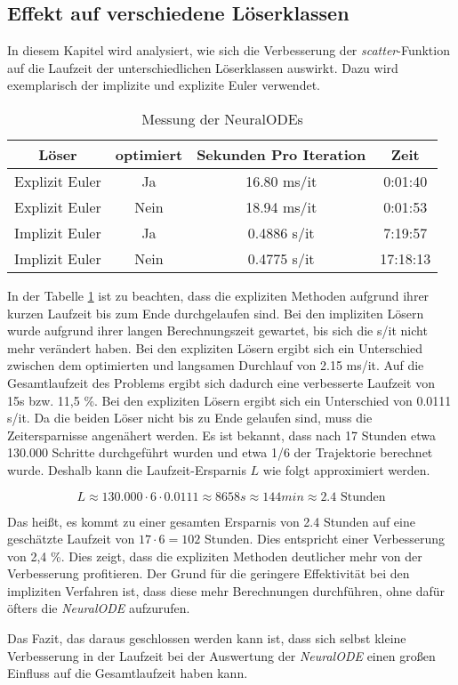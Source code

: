 \subsection{Effekt auf verschiedene Löserklassen}

In diesem Kapitel wird analysiert, wie sich die Verbesserung der \textit{scatter}-Funktion auf die Laufzeit der unterschiedlichen 
Löserklassen auswirkt.
Dazu wird exemplarisch der implizite und explizite Euler verwendet.

\begin{table}[h!]
\centering
    \begin{tabular}{c|c|c|c}
         Löser & optimiert & Sekunden Pro Iteration & Zeit \\
         \hline
         Explizit Euler & Ja & 16.80 ms/it & 0:01:40 \\
         Explizit Euler & Nein & 18.94 ms/it & 0:01:53 \\
         Implizit Euler & Ja & 0.4886 s/it & 7:19:57 \\
         Implizit Euler & Nein &  0.4775 s/it & 17:18:13 \\
    \end{tabular}
    \caption{Messung der NeuralODEs}
    \label{tab:langzeitMessung}
\end{table}

In der Tabelle \ref{tab:langzeitMessung} ist zu beachten, dass die expliziten Methoden aufgrund ihrer kurzen Laufzeit bis zum Ende durchgelaufen sind.
Bei den impliziten Lösern wurde aufgrund ihrer langen Berechnungszeit gewartet, bis sich die s/it nicht mehr verändert haben.
Bei den expliziten Lösern ergibt sich ein Unterschied zwischen dem optimierten und langsamen Durchlauf von 2.15 ms/it.
Auf die Gesamtlaufzeit des Problems ergibt sich dadurch eine verbesserte Laufzeit von 15s bzw. 11,5 \%.
Bei den expliziten Lösern ergibt sich ein Unterschied von 0.0111 s/it.
Da die beiden Löser nicht bis zu Ende gelaufen sind, muss die Zeitersparnisse angenähert werden.
Es ist bekannt, dass nach 17 Stunden etwa 130.000 Schritte durchgeführt wurden und etwa 1/6 der Trajektorie berechnet wurde.
Deshalb kann die Laufzeit-Ersparnis $L$ wie folgt approximiert werden.

$$
L \approx 130.000 \cdot 6 \cdot 0.0111 \approx 8658s \approx 144 min \approx 2.4 \text{ Stunden} 
$$

Das heißt, es kommt zu einer gesamten Ersparnis von 2.4 Stunden auf eine geschätzte Laufzeit von $17 \cdot 6 = 102 $ Stunden.
Dies entspricht einer Verbesserung von 2,4 \%.
Dies zeigt, dass die expliziten Methoden deutlicher mehr von der Verbesserung profitieren.
Der Grund für die geringere Effektivität bei den impliziten Verfahren ist, dass diese mehr Berechnungen durchführen, ohne dafür öfters 
die \textit{NeuralODE} aufzurufen.

Das Fazit, das daraus geschlossen werden kann ist, dass sich selbst kleine Verbesserung in der Laufzeit 
bei der Auswertung der \textit{NeuralODE} einen großen Einfluss auf die Gesamtlaufzeit haben kann.



